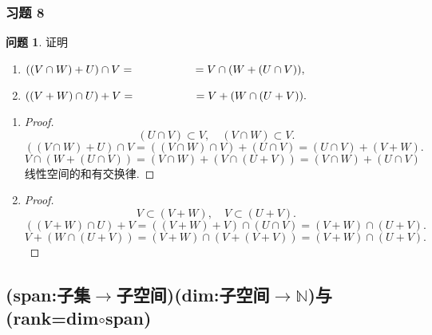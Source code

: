 \documentclass[11pt]{ctexart}
\theoremstyle{definition}
\newtheorem{qqq}{问题}[section]
\numberwithin{equation}{section}
\begin{document}
\subsubsection{习题 8}
\begin{qqq}
    证明\begin{enumerate}
        \item $((V\cap W)+U)\cap V=\hspace{2 cm} =V\cap (W+(U\cap V)),$
        \item $((V+W)\cap U)+V= \hspace{2 cm} = V+(W\cap (U+V)).$
    \end{enumerate}
\end{qqq}
\begin{aaa}
\begin{enumerate}
    \item \begin{proof}
            \[(U\cap V)\subset V ,\quad (V\cap W)\subset V.\]
            \[((V\cap W)+U)\cap V=((V\cap W)\cap V)+(U\cap V)=(U\cap V)+(V+W).\]
            \[V\cap (W+(U\cap V))=(V\cap W)+(V\cap (U+V))=(V\cap W)+(U\cap V)\]
            线性空间的和有交换律.
            \end{proof}

    \item \begin{proof}
             \[V\subset (V+W),\quad V\subset (U+V).\]
             \[((V+W)\cap U)+V=((V+W)+V)\cap (U\cap V)=(V+W)\cap (U+ V).\]
             \[V+(W\cap(U+V))=(V+W)\cap(V+(V+V))=(V+W)\cap (U+V).\]
            \end{proof}
\end{enumerate}
\end{aaa}



\subsection{(span:子集$\rightarrow$子空间)(dim:子空间$\rightarrow \mathbb{N}$)与(rank=dim$\circ $span)}
\end{document}
